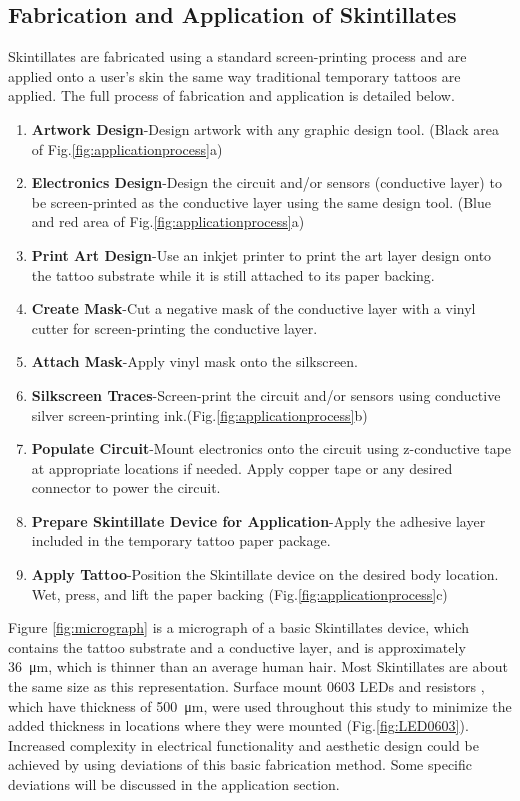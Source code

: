 \documentclass{sigchi}
\begin{document}
\subsection{Fabrication and Application of Skintillates}
Skintillates are fabricated using a standard screen-printing process and are applied onto a user's skin the same way traditional temporary tattoos are applied. The full process of fabrication and application is detailed below.
\begin{enumerate}
  \item \textbf{Artwork Design}-Design artwork with any graphic design tool. (Black area of Fig.\ref{fig:applicationprocess}a)
  \item \textbf{Electronics Design}-Design the circuit and/or sensors (conductive layer) to be screen-printed as the conductive layer using the same design tool. (Blue and red area  of Fig.\ref{fig:applicationprocess}a) 
  \item \textbf{Print Art Design}-Use an inkjet printer to print the art layer design onto the tattoo substrate while it is still attached to its paper backing. 
  \item \textbf{Create Mask}-Cut a negative mask of the conductive layer with a vinyl cutter for screen-printing the conductive layer.
  \item \textbf{Attach Mask}-Apply vinyl mask onto the silkscreen.
  \item \textbf{Silkscreen Traces}-Screen-print the circuit and/or sensors using conductive silver screen-printing ink.(Fig.\ref{fig:applicationprocess}b) 
  \item \textbf{Populate Circuit}-Mount electronics onto the circuit using z-conductive tape at appropriate locations if needed. Apply copper tape or any desired connector to power the circuit. 
  \item \textbf{Prepare Skintillate Device for Application}-Apply the adhesive layer included in the temporary tattoo paper package.
  \item \textbf{Apply Tattoo}-Position the Skintillate device on the desired body location. Wet, press, and lift the paper backing (Fig.\ref{fig:applicationprocess}c) 
\end{enumerate}
Figure \ref{fig:micrograph} is a micrograph of a basic Skintillates device, which contains the tattoo substrate and a conductive layer, and is approximately 36\SI{}{\micro\metre}, which is thinner than an average human hair.  Most Skintillates are about the same size as this representation. Surface mount 0603 LEDs and resistors%
, which have thickness of  \SI{500}{\micro\metre}, were used throughout this study to minimize the added thickness in locations where they were mounted (Fig.\ref{fig:LED0603}). Increased complexity in electrical functionality and aesthetic design could be achieved by using deviations of this basic fabrication method. Some specific deviations will be discussed in the application section. 
\end{document}
